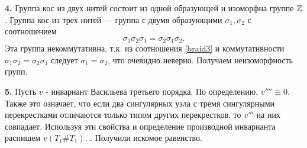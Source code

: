 \documentclass[a4paper]{article}
\begin{document}
\textbf{4.} Группа кос из двух нитей состоит из одной образующей и
изоморфна группе \( {\mathbb Z} \). Группа кос из трех нитей --- группа с
двумя образующими \( \sigma_1, \sigma_2 \) с соотношением
\begin{equation}
  \label{braid3}
  \sigma_1
  \sigma _2 \sigma _1 = \sigma _2 \sigma _1 \sigma _2.
\end{equation}
Эта группа некоммутативна, т.к. из соотношения \ref{braid3} и
коммутативности \( \sigma _1 \sigma _2  = \sigma _2 \sigma _1\)
следует \( \sigma _1 = \sigma _2 \), что очевидно неверно. Получаем
неизоморфность групп.

\textbf{5.} Пусть \( v \) - инвариант Васильева третьего порядка. По
определению, \( v'''' \equiv 0\). Также это означает, что если два
сингулярных узла с тремя сингулярными перекрестками отличаются только
типом других перекрестков, то \( v''' \) на них совпадает. Используя
эти свойства и определение производной инварианта распишем \( v(T_1 \# T_1) \).
\newpage
.
\newpage
Получили искомое равенство.
\end{document}
